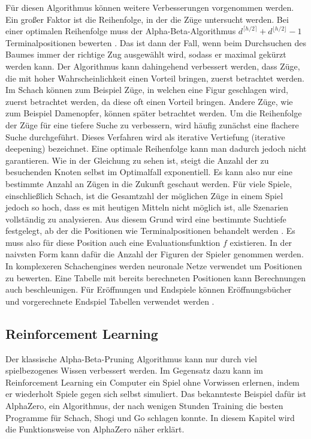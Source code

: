 Für diesen Algorithmus können weitere Verbesserungen vorgenommen werden. Ein großer Faktor ist die Reihenfolge, in der die Züge untersucht werden. Bei einer optimalen Reihenfolge muss der Alpha-Beta-Algorithmus $d^{\lceil h/2 \rceil} + d^{\lfloor h/2 \rfloor} - 1$ Terminalpositionen bewerten \cite{knuth_analysis_1975}. Das ist dann der Fall, wenn beim Durchsuchen des Baumes immer der richtige Zug ausgewählt wird, sodass er maximal gekürzt werden kann. Der Algorithmus kann dahingehend verbessert werden, dass Züge, die mit hoher Wahrscheinlichkeit einen Vorteil bringen, zuerst betrachtet werden. Im Schach können zum Beispiel Züge, in welchen eine Figur geschlagen wird, zuerst betrachtet werden, da diese oft einen Vorteil bringen. Andere Züge, wie zum Beispiel Damenopfer, können später betrachtet werden.
Um die Reihenfolge der Züge für eine tiefere Suche zu verbessern, wird häufig zunächst eine flachere Suche durchgeführt. Dieses Verfahren wird als iterative Vertiefung (iterative deepening) bezeichnet. 
Eine optimale Reihenfolge kann man dadurch jedoch nicht garantieren. Wie in der Gleichung zu sehen ist, steigt die Anzahl der zu besuchenden Knoten selbst im Optimalfall exponentiell. Es kann also nur eine bestimmte Anzahl an Zügen in die Zukunft geschaut werden. Für viele Spiele, einschließlich Schach, ist die Gesamtzahl der möglichen Züge in einem Spiel jedoch so hoch, dass es mit heutigen Mitteln nicht möglich ist, alle Szenarien vollständig zu analysieren. Aus diesem Grund wird eine bestimmte Suchtiefe festgelegt, ab der die Positionen wie Terminalpositionen behandelt werden \cite{knuth_analysis_1975}. Es muss also für diese Position auch eine Evaluationsfunktion $f$ existieren. In der naivsten Form kann dafür die Anzahl der Figuren der Spieler genommen werden. In komplexeren Schachengines werden neuronale Netze verwendet um Positionen zu bewerten. Eine Tabelle mit bereits berechneten Positionen kann Berechnungen auch beschleunigen. Für Eröffnungen und Endspiele können Eröffnungsbücher und vorgerechnete Endspiel Tabellen verwendet werden \cite{silver_mastering_2017}.

\subsection{Reinforcement Learning}\label{cp:alphazero}
Der klassische Alpha-Beta-Pruning Algorithmus kann nur durch viel spielbezogenes Wissen verbessert werden. Im Gegensatz dazu kann im Reinforcement Learning ein Computer ein Spiel ohne Vorwissen erlernen, indem er wiederholt Spiele gegen sich selbst simuliert. Das bekannteste Beispiel dafür ist AlphaZero, ein Algorithmus, der nach wenigen Stunden Training die besten Programme für Schach, Shogi und Go schlagen konnte. \cite{silver_mastering_2017} In diesem Kapitel wird die Funktionsweise von AlphaZero näher erklärt.

